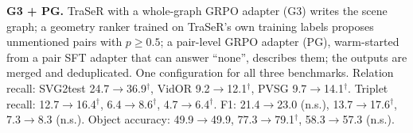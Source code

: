 \documentclass[11pt,openany]{book}
\newcommand{\sig}{\ensuremath{^\dagger}}
\begin{document}
\begin{bestbox}
\textbf{G3 + PG.} TraSeR with a whole-graph GRPO adapter (G3) writes the scene graph; a geometry ranker trained on TraSeR's own
training labels proposes unmentioned pairs with $p \ge 0.5$; a pair-level GRPO adapter (PG), warm-started from a pair SFT adapter
that can answer ``none'', describes them; the outputs are merged and deduplicated. One configuration for all three benchmarks.
Relation recall: SVG2test 24.7$\to$36.9\sig, VidOR 9.2$\to$12.1\sig, PVSG 9.7$\to$14.1\sig. Triplet recall: 12.7$\to$16.4\sig,
6.4$\to$8.6\sig, 4.7$\to$6.4\sig. F1: 21.4$\to$23.0 (n.s.), 13.7$\to$17.6\sig, 7.3$\to$8.3 (n.s.). Object accuracy: 49.9$\to$49.9,
77.3$\to$79.1\sig, 58.3$\to$57.3 (n.s.).
\end{bestbox}

\appendix
\end{document}
